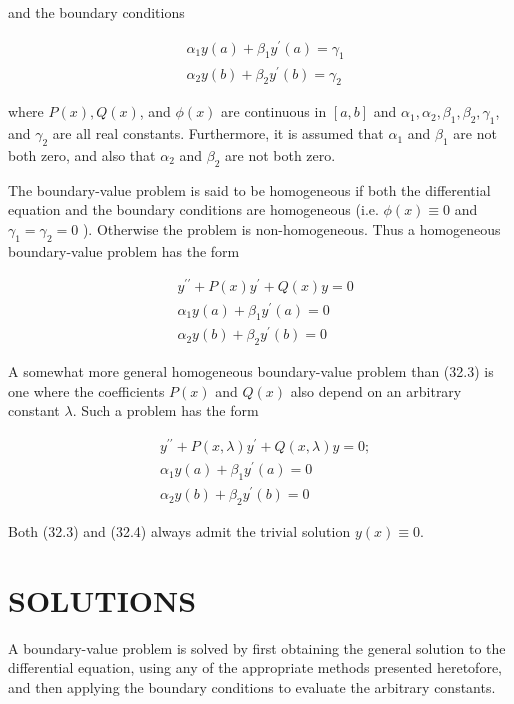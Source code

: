 \documentclass[10pt]{article}
\begin{document}
and the boundary conditions


\begin{align*}
& \alpha_{1} y(a)+\beta_{1} y^{\prime}(a)=\gamma_{1}  \tag{32.2}\\
& \alpha_{2} y(b)+\beta_{2} y^{\prime}(b)=\gamma_{2}
\end{align*}


where $P(x), Q(x)$, and $\phi(x)$ are continuous in $[a, b]$ and $\alpha_{1}, \alpha_{2}, \beta_{1}, \beta_{2}, \gamma_{1}$, and $\gamma_{2}$ are all real constants. Furthermore, it is assumed that $\alpha_{1}$ and $\beta_{1}$ are not both zero, and also that $\alpha_{2}$ and $\beta_{2}$ are not both zero.

The boundary-value problem is said to be homogeneous if both the differential equation and the boundary conditions are homogeneous (i.e. $\phi(x) \equiv 0$ and $\gamma_{1}=\gamma_{2}=0$ ). Otherwise the problem is non-homogeneous. Thus a homogeneous boundary-value problem has the form


\begin{align*}
& y^{\prime \prime}+P(x) y^{\prime}+Q(x) y=0 \\
& \alpha_{1} y(a)+\beta_{1} y^{\prime}(a)=0  \tag{32.3}\\
& \alpha_{2} y(b)+\beta_{2} y^{\prime}(b)=0
\end{align*}


A somewhat more general homogeneous boundary-value problem than (32.3) is one where the coefficients $P(x)$ and $Q(x)$ also depend on an arbitrary constant $\lambda$. Such a problem has the form


\begin{align*}
& y^{\prime \prime}+P(x, \lambda) y^{\prime}+Q(x, \lambda) y=0 ; \\
& \alpha_{1} y(a)+\beta_{1} y^{\prime}(a)=0  \tag{32.4}\\
& \alpha_{2} y(b)+\beta_{2} y^{\prime}(b)=0
\end{align*}


Both (32.3) and (32.4) always admit the trivial solution $y(x) \equiv 0$.

\section*{SOLUTIONS}
A boundary-value problem is solved by first obtaining the general solution to the differential equation, using any of the appropriate methods presented heretofore, and then applying the boundary conditions to evaluate the arbitrary constants.
\end{document}
